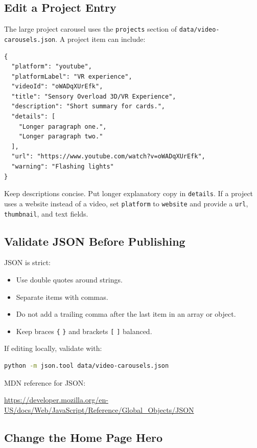 \documentclass[11pt]{article}
\begin{document}
\subsection{Edit a Project Entry}

The large project carousel uses the \texttt{projects} section of \texttt{data/video-carousels.json}. A project item can include:

\begin{lstlisting}
{
  "platform": "youtube",
  "platformLabel": "VR experience",
  "videoId": "oWADqXUrEfk",
  "title": "Sensory Overload 3D/VR Experience",
  "description": "Short summary for cards.",
  "details": [
    "Longer paragraph one.",
    "Longer paragraph two."
  ],
  "url": "https://www.youtube.com/watch?v=oWADqXUrEfk",
  "warning": "Flashing lights"
}
\end{lstlisting}

Keep descriptions concise. Put longer explanatory copy in \texttt{details}. If a project uses a website instead of a video, set \texttt{platform} to \texttt{website} and provide a \texttt{url}, \texttt{thumbnail}, and text fields.

\subsection{Validate JSON Before Publishing}

JSON is strict:

\begin{itemize}
  \item Use double quotes around strings.
  \item Separate items with commas.
  \item Do not add a trailing comma after the last item in an array or object.
  \item Keep braces \texttt{\{} \texttt{\}} and brackets \texttt{[} \texttt{]} balanced.
\end{itemize}

If editing locally, validate with:

\begin{lstlisting}[language=bash]
python -m json.tool data/video-carousels.json
\end{lstlisting}

MDN reference for JSON:

\url{https://developer.mozilla.org/en-US/docs/Web/JavaScript/Reference/Global_Objects/JSON}

\subsection{Change the Home Page Hero}
\end{document}
